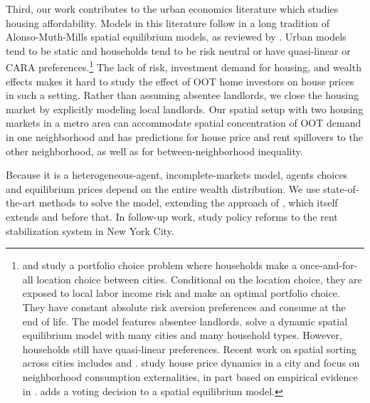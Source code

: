 \documentclass[letterpaper,12pt,dvipsnames,usenames]{article}
\theoremstyle{definition}
\begin{document}
\begin{spacing}{1.25}
Third, our work contributes to the urban economics literature which studies housing affordability. Models in this literature follow in a long tradition of Alonso-Muth-Mills spatial equilibrium models, as reviewed by \citet{Brueckner:87}. Urban models tend to be static and households tend to be risk neutral or have quasi-linear or CARA preferences.\footnote{\citet{hizmo:15} and \citet{OMP:16} study a portfolio choice problem where households make a once-and-for-all location choice between cities. Conditional on the location choice, they are exposed to local labor income risk and make an optimal portfolio choice. They have constant absolute risk aversion preferences and consume at the end of life. The model features absentee landlords. \citet{VNW:10} solve a dynamic spatial equilibrium model with many cities and many household types. However, households still have quasi-linear preferences. Recent work on spatial sorting across cities includes \citet*{BDRN:14} and \citet*{EPS:14}. \citet*{GHH:13} study house price dynamics in a city and focus on neighborhood consumption externalities, in part based on empirical evidence in \citet*{Rossi-Hans:2010}. \citet{parkhomenko:20} adds a voting decision to a spatial equilibrium model.} The lack of risk, investment demand for housing, and wealth effects makes it hard to study the effect of OOT home investors on house prices in such a setting. Rather than assuming absentee landlords, we close the housing market by explicitly modeling  local landlords. Our spatial setup with two housing markets in a metro area can accommodate spatial concentration of OOT demand in one neighborhood and has predictions for house price and rent spillovers to the other neighborhood, as well as for between-neighborhood inequality.

Because it is a heterogeneous-agent, incomplete-markets model, agents choices and equilibrium prices depend on the entire wealth distribution.  We use state-of-the-art methods to solve the model, extending the approach of \citet{favilukis/ludvigson/nieuwerburgh:09}, which itself extends \citet{Gomes-Michaelides:07} and \citet{krusell/smith:98} before that. In follow-up work, \citet{FMVN:21} study policy reforms to the rent stabilization system in New York City.



\end{spacing}
\end{document}
